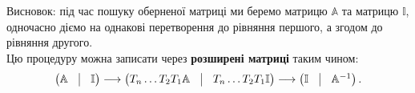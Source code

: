 \documentclass{math_library}
\begin{document}
Висновок: під час пошуку оберненої матриці ми беремо матрицю $\mathbb{A}$ та матрицю $\mathbb{I}$, одночасно діємо на однакові перетворення до рівняння першого, а згодом до рівняння другого.\\
Цю процедуру можна записати через \textbf{розширені матриці} таким чином:\\
\[
\begin{pmatrix}
\mathbb{A} & \vline & \mathbb{I}
\end{pmatrix} \longrightarrow \begin{pmatrix}
T_n \dots T_2 T_1 \mathbb{A} & \vline & T_n \dots T_2 T_1 \mathbb{I}
\end{pmatrix} \longrightarrow \begin{pmatrix}
\mathbb{I} & \vline & \mathbb{A}^{-1}
\end{pmatrix}.
\]
\end{document}

